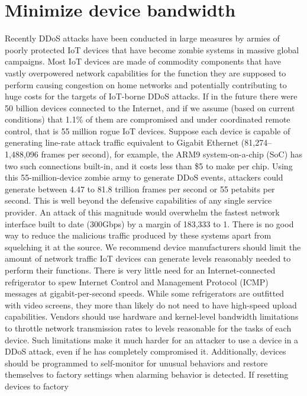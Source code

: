 \documentclass[12pt]{report}
\begin{document}
\section{Minimize device bandwidth}

Recently DDoS attacks have been conducted in large measures by armies of poorly 
protected IoT devices that have become zombie systems in massive global campaigns. 
Most IoT devices are made of commodity components that have vastly overpowered network 
capabilities for the function they are supposed to perform causing congestion on home 
networks and potentially contributing to huge costs for the targets of IoT-borne DDoS 
attacks. If in the future there were 50 billion devices connected to the Internet, 
and if we assume (based on current conditions) that 1.1\% of them are compromised and 
under coordinated remote control, that is 55 million rogue IoT devices. 
Suppose each device is capable of generating line-rate attack traffic equivalent 
to Gigabit Ethernet (81,274–1,488,096 frames per second), for example, 
the ARM9 system-on-a-chip (SoC) has two such connections built-in, and it costs 
less than \$5 to make per chip. Using this 55-million-device zombie army to generate 
DDoS events, attackers could generate between 4.47 to 81.8 trillion frames per second 
or 55 petabits per second. This is well beyond the defensive capabilities of any 
single service provider. An attack of this magnitude would overwhelm the fastest 
network interface built to date (300Gbps) by a margin of 183,333 to 1. 
There is no good way to reduce the malicious traffic produced by these systems
apart from squelching it at the source. We recommend device manufacturers should 
limit the amount of network traffic IoT devices can generate levels reasonably 
needed to perform their functions. There is very little need for an Internet-connected 
refrigerator to spew Internet Control and Management Protocol (ICMP) messages at 
gigabit-per-second speeds. While some refrigerators are outfitted with video screens, 
they more than likely do not need to have high-speed upload capabilities. 
Vendors should use hardware and kernel-level bandwidth limitations to throttle 
network transmission rates to levels reasonable for the tasks of each device. 
Such limitations make it much harder for an attacker to use a device in a DDoS 
attack, even if he has completely compromised it. Additionally, devices should 
be programmed to self-monitor for unusual behaviors and restore themselves to 
factory settings when alarming behavior is detected. If resetting devices to factory 
\end{document}
